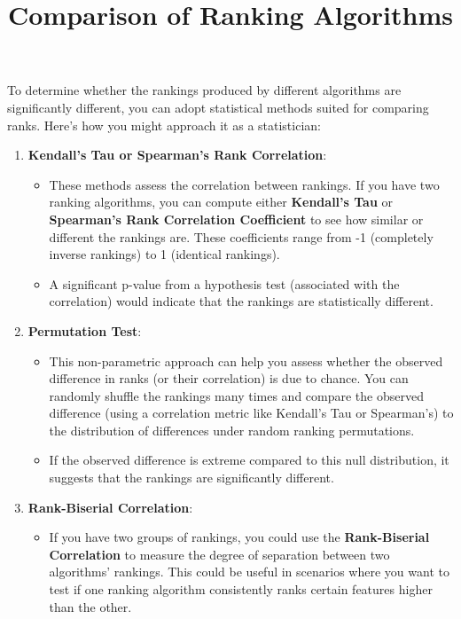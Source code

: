 \documentclass{article}
\title{Comparison of Ranking Algorithms}
\author{}
\date{}
\begin{document}
\maketitle

To determine whether the rankings produced by different algorithms are significantly different, you can adopt statistical methods suited for comparing ranks. Here’s how you might approach it as a statistician:

\begin{enumerate}
    \item \textbf{Kendall’s Tau or Spearman’s Rank Correlation}:  
    \begin{itemize}
        \item These methods assess the correlation between rankings. If you have two ranking algorithms, you can compute either \textbf{Kendall's Tau} or \textbf{Spearman's Rank Correlation Coefficient} to see how similar or different the rankings are. These coefficients range from -1 (completely inverse rankings) to 1 (identical rankings).
        \item A significant p-value from a hypothesis test (associated with the correlation) would indicate that the rankings are statistically different.
    \end{itemize}

    \item \textbf{Permutation Test}:  
    \begin{itemize}
        \item This non-parametric approach can help you assess whether the observed difference in ranks (or their correlation) is due to chance. You can randomly shuffle the rankings many times and compare the observed difference (using a correlation metric like Kendall’s Tau or Spearman’s) to the distribution of differences under random ranking permutations.
        \item If the observed difference is extreme compared to this null distribution, it suggests that the rankings are significantly different.
    \end{itemize}

    \item \textbf{Rank-Biserial Correlation}:  
    \begin{itemize}
        \item If you have two groups of rankings, you could use the \textbf{Rank-Biserial Correlation} to measure the degree of separation between two algorithms’ rankings. This could be useful in scenarios where you want to test if one ranking algorithm consistently ranks certain features higher than the other.
    \end{itemize}


\end{enumerate}
\end{document}
